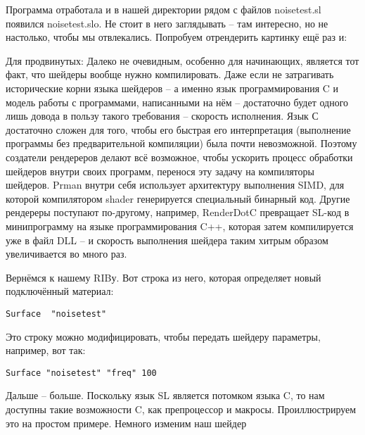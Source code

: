  Программа отработала и в нашей директории рядом с
    файлов noisetest.sl появился noisetest.slo. Не стоит в него
    заглядывать – там интересно, но не настолько, чтобы мы отвлекались.
    Попробуем отрендерить картинку ещё раз и:
  

  

 Для
    продвинутых: Далеко не очевидным,
    особенно для начинающих, является тот факт, что шейдеры вообще
    нужно компилировать. Даже если не затрагивать исторические корни
    языка шейдеров – а именно язык программирования C и модель работы с
    программами, написанными на нём  – достаточно будет одного лишь
    довода в пользу такого требования – скорость исполнения. Язык С
    достаточно сложен для того, чтобы его быстрая его интерпретация
    (выполнение программы без предварительной компиляции) была почти
    невозможной. Поэтому создатели рендереров делают всё возможное,
    чтобы ускорить процесс обработки шейдеров внутри своих программ,
    перенося эту задачу на компиляторы шейдеров. Prman внутри себя
    использует архитектуру выполнения SIMD, для которой компилятором
    shader генерируется специальный бинарный код. Другие рендереры
    поступают по-другому, например, RenderDotC превращает SL-код в
    минипрограмму на языке программирования C++, которая затем
    компилируется уже в файл DLL – и скорость выполнения шейдера таким
    хитрым образом увеличивается во много раз.
  

 Вернёмся к нашему RIBу. Вот строка из него, которая
    определяет новый подключённый материал:
  
\begin{lstlisting}[frame=single, framerule=0pt, framesep=10pt, xleftmargin=10pt, xrightmargin=10pt, basicstyle=\ttfamily \small, backgroundcolor=\color{light-gray}]
Surface  "noisetest"
\end{lstlisting}

 Это строку можно модифицировать, чтобы передать
    шейдеру параметры, например, вот так:

\begin{lstlisting}[frame=single, framerule=0pt, framesep=10pt, xleftmargin=10pt, xrightmargin=10pt, basicstyle=\ttfamily \small, backgroundcolor=\color{light-gray}]
Surface "noisetest" "freq" 100
\end{lstlisting}

  

 Дальше – больше. Поскольку язык SL является
    потомком языка C, то нам доступны такие возможности C, как
    препроцессор и макросы. Проиллюстрируем это на простом примере.
    Немного изменим наш шейдер
  
